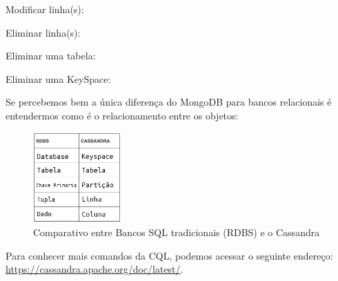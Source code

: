 Modificar linha(s): \\

Eliminar linha(s): \\

Eliminar uma tabela: \\

Eliminar uma KeySpace: \\

Se percebemos bem a única diferença do MongoDB para bancos relacionais é entendermos como é o relacionamento entre os objetos:
\begin{figure}[H]
	\centering
	\includegraphics[width=0.3\textwidth]{imagens/comparativo}
	\caption{Comparativo entre Bancos SQL tradicionais (RDBS) e o Cassandra}
\end{figure}

Para conhecer mais comandos da CQL, podemos acessar o seguinte endereço: \url{https://cassandra.apache.org/doc/latest/}.